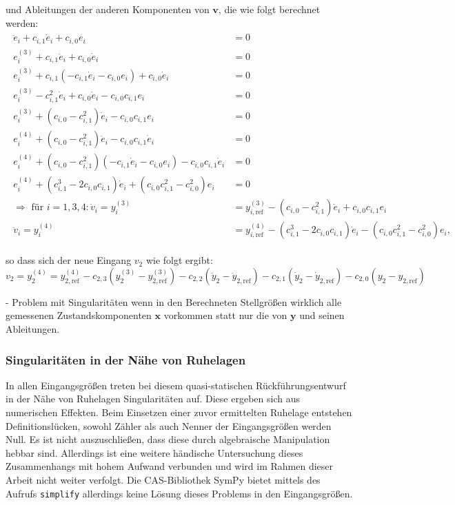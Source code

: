 und Ableitungen der anderen Komponenten von $\mathbf{v}$, die wie folgt berechnet werden:
\begin{align}
	\begin{split}
	    \ddot{e}_i + c_{i,1} \dot{e}_i + c_{i, 0} e_i &= 0 \\
		e_i^{(3)} + c_{i, 1} \ddot{e}_i + c_{i, 0} \dot{e}_i &= 0 \\
		e_i^{(3)} + c_{i, 1} (-c_{i, 1} \dot{e}_i - c_{i, 0} e_i) + c_{i, 0} \dot{e}_i &= 0 \\
		e_i^{(3)} - c_{i, 1}^2 \dot{e}_i + c_{i, 0} \dot{e}_i - c_{i, 0} c_{i, 1} e_i &= 0 \\
		e_i^{(3)} + (c_{i, 0} - c_{i, 1}^2) \dot{e}_i - c_{i, 0} c_{i, 1} e_i &= 0 \\
		e_i^{(4)} + (c_{i, 0} - c_{i, 1}^2) \ddot{e}_i - c_{i, 0} c_{i, 1} \dot{e}_i &= 0 \\
		e_i^{(4)} + (c_{i, 0} - c_{i, 1}^2) (-c_{i, 1} \dot{e}_i - c_{i, 0} e_i) - c_{i, 0} c_{i, 1} \dot{e}_i &= 0 \\
		e_i^{(4)} + (c_{i, 1}^3 - 2 c_{i, 0} c_{i, 1}) \dot{e}_i + (c_{i, 0} c_{i, 1}^2 - c_{i, 0}^2) e_i &= 0 \\
		\Rightarrow \text{ für } i = 1,3,4: \dot{v}_i = y_i^{(3)} &= y_{i, \text{ref}}^{(3)} - (c_{i, 0} - c_{i, 1}^2) \dot{e}_i + c_{i, 0} c_{i, 1} e_i \\
		\ddot{v}_i = y_i^{(4)} &= y_{i, \text{ref}}^{(4)} - (c_{i, 1}^3 - 2 c_{i, 0} c_{i, 1}) \dot{e}_i - (c_{i, 0} c_{i, 1}^2 - c_{i, 0}^2) e_i,
	\end{split}
\end{align}

so dass sich der neue Eingang $v_2$ wie folgt ergibt:
\begin{equation}
	v_2 = y_2^{(4)} = y_{2, \text{ref}}^{(4)} - c_{2, 3} (y_2^{(3)} - y_{2, \text{ref}}^{(3)}) - c_{2, 2} (\ddot{y}_2 - \ddot{y}_{2, \text{ref}}) - c_{2, 1} (\dot{y}_2 - \dot{y}_{2, \text{ref}}) - c_{2, 0} (y_2 - y_{2, \text{ref}})
\end{equation} 

- Problem mit Singularitäten wenn in den Berechneten Stellgrößen wirklich alle gemessenen Zustandskomponenten $\mathbf{x}$ vorkommen statt nur die von $\mathbf{y}$ und seinen Ableitungen.

\subsubsection{Singularitäten in der Nähe von Ruhelagen}
In allen Eingangsgrößen treten bei diesem quasi-statischen Rückführungsentwurf in der Nähe von Ruhelagen Singularitäten auf. Diese ergeben sich aus numerischen Effekten. Beim Einsetzen einer zuvor ermittelten Ruhelage entstehen Definitionslücken, sowohl Zähler als auch Nenner der Eingangsgrößen werden Null. Es ist nicht auszuschließen, dass diese durch algebraische Manipulation hebbar sind. Allerdings ist eine weitere händische Untersuchung dieses Zusammenhangs mit hohem Aufwand verbunden und wird im Rahmen dieser Arbeit nicht weiter verfolgt. Die CAS-Bibliothek SymPy bietet mittels des Aufrufs \texttt{simplify} allerdings keine Lösung dieses Problems in den Eingangsgrößen.

